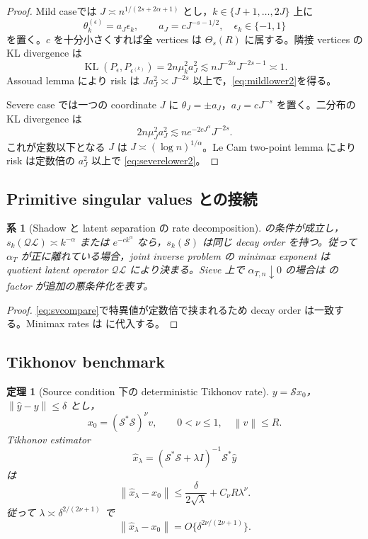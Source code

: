 \documentclass[11pt,a4paper]{ltjsarticle}
\newtheorem{theorem}{定理}[section]
\newtheorem{corollary}{系}[section]
\theoremstyle{remark}
\newcommand{\wh}{\widehat}
\newcommand{\norm}[1]{\left\lVert#1\right\rVert}
\newcommand{\Lop}{\mathscr L}
\newcommand{\Sop}{\mathscr S}
\newcommand{\Qop}{\mathscr Q}
\newcommand{\KL}{\operatorname{KL}}
\begin{document}
\begin{proof}
Mild caseでは $J\asymp n^{1/(2s+2\alpha+1)}$ とし，$k\in\{J+1,\ldots,2J\}$ 上に
\[
\theta_k^{(\epsilon)}=a_J\epsilon_k,
\qquad
a_J=cJ^{-s-1/2},
\quad\epsilon_k\in\{-1,1\}
\]
を置く。$c$ を十分小さくすれば全 vertices は $\Theta_s(R)$ に属する。隣接 vertices の KL divergence は
\[
\KL(P_\epsilon,P_{\epsilon^{(k)}})
=2n\mu_k^2a_J^2
\lesssim nJ^{-2\alpha}J^{-2s-1}\asymp1.
\]
Assouad lemma により risk は $Ja_J^2\asymp J^{-2s}$ 以上で，\eqref{eq:mildlower2}を得る。

Severe case では一つの coordinate $J$ に $\theta_J=\pm a_J$，$a_J=cJ^{-s}$ を置く。二分布の KL divergence は
\[
2n\mu_J^2a_J^2
\lesssim ne^{-2cJ^\alpha}J^{-2s}.
\]
これが定数以下となる $J$ は $J\asymp(\log n)^{1/\alpha}$。Le Cam two-point lemma により risk は定数倍の $a_J^2$ 以上で \eqref{eq:severelower2}。
\end{proof}

\subsection{Primitive singular values との接続}
\begin{corollary}[Shadow と latent separation の rate decomposition]\label{cor:rateprimitive}
の条件が成立し，$s_k(\Qop\Lop)\asymp k^{-\alpha}$ または $e^{-ck^\alpha}$ なら，$s_k(\Sop)$ は同じ decay order を持つ。従って $\alpha_T$ が正に離れている場合，joint inverse problem の minimax exponent は quotient latent operator $\Qop\Lop$ により決まる。Sieve 上で $\alpha_{T,n}\downarrow0$ の場合は の factor が追加の悪条件化を表す。
\end{corollary}

\begin{proof}
\eqref{eq:svcompare}で特異値が定数倍で挟まれるため decay order は一致する。Minimax rates は に代入する。
\end{proof}

\subsection{Tikhonov benchmark}
\begin{theorem}[Source condition 下の deterministic Tikhonov rate]\label{thm:tikh2}
$y=\Sop x_0$，$\norm{\wh y-y}\le\delta$ とし，
\[
x_0=(\Sop^*\Sop)^\nu v,
\qquad0<\nu\le1,
\quad\norm v\le R.
\]
Tikhonov estimator
\[
\wh x_\lambda
=(\Sop^*\Sop+\lambda I)^{-1}\Sop^*\wh y
\]
は
\begin{equation}
\norm{\wh x_\lambda-x_0}
\le\frac{\delta}{2\sqrt\lambda}
+C_\nu R\lambda^\nu.
\label{eq:tikhbound2}
\end{equation}
従って $\lambda\asymp\delta^{2/(2\nu+1)}$ で
\[
\norm{\wh x_\lambda-x_0}
=O\{\delta^{2\nu/(2\nu+1)}\}.
\]
\end{theorem}
\end{document}
